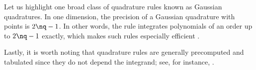 Let us highlight one broad class of quadrature rules known as Gaussian
quadratures. In one dimension, the precision of a Gaussian quadrature with \nq
points is $2 \nq - 1$. In other words, the rule integrates polynomials of an
order up to $2 \nq - 1$ exactly, which makes such rules especially efficient
\cite{heiss2008}.

Lastly, it is worth noting that quadrature rules are generally precomputed and
tabulated since they do not depend the integrand; see, for instance,
\cite{burkardt}.
